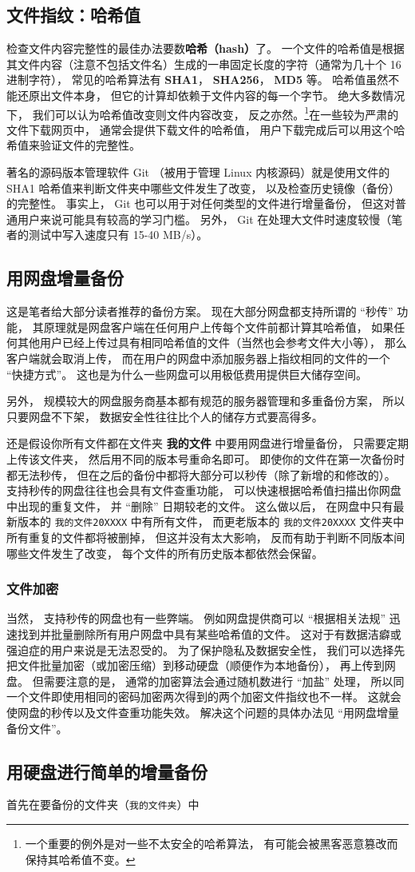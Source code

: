 \subsection{文件指纹：哈希值}
检查文件内容完整性的最佳办法要数\textbf{哈希（hash）}了。 一个文件的哈希值是根据其文件内容（注意不包括文件名）生成的一串固定长度的字符（通常为几十个 16 进制字符）， 常见的哈希算法有 \textbf{SHA1}， \textbf{SHA256}， \textbf{MD5} 等。 哈希值虽然不能还原出文件本身， 但它的计算却依赖于文件内容的每一个字节。 绝大多数情况下， 我们可以认为哈希值改变则文件内容改变， 反之亦然。\footnote{一个重要的例外是对一些不太安全的哈希算法， 有可能会被黑客恶意篡改而保持其哈希值不变。}在一些较为严肃的文件下载网页中， 通常会提供下载文件的哈希值， 用户下载完成后可以用这个哈希值来验证文件的完整性。

著名的源码版本管理软件 Git （被用于管理 Linux 内核源码）就是使用文件的 SHA1 哈希值来判断文件夹中哪些文件发生了改变， 以及检查历史镜像（备份）的完整性。 事实上， Git 也可以用于对任何类型的文件进行增量备份， 但这对普通用户来说可能具有较高的学习门槛。 另外， Git 在处理大文件时速度较慢（笔者的测试中写入速度只有 15-40 MB/s）。

\subsection{用网盘增量备份}
这是笔者给大部分读者推荐的备份方案。 现在大部分网盘都支持所谓的 “秒传” 功能， 其原理就是网盘客户端在任何用户上传每个文件前都计算其哈希值， 如果任何其他用户已经上传过具有相同哈希值的文件（当然也会参考文件大小等）， 那么客户端就会取消上传， 而在用户的网盘中添加服务器上指纹相同的文件的一个 “快捷方式”。 这也是为什么一些网盘可以用极低费用提供巨大储存空间。

另外， 规模较大的网盘服务商基本都有规范的服务器管理和多重备份方案， 所以只要网盘不下架， 数据安全性往往比个人的储存方式要高得多。

还是假设你所有文件都在文件夹 \textbf{我的文件} 中要用网盘进行增量备份， 只需要定期上传该文件夹， 然后用不同的版本号重命名即可。 即使你的文件在第一次备份时都无法秒传， 但在之后的备份中都将大部分可以秒传（除了新增的和修改的）。 支持秒传的网盘往往也会具有文件查重功能， 可以快速根据哈希值扫描出你网盘中出现的重复文件， 并 “删除” 日期较老的文件。 这么做以后， 在网盘中只有最新版本的 \verb|我的文件20XXXX| 中有所有文件， 而更老版本的 \verb|我的文件20XXXX| 文件夹中所有重复的文件都将被删掉， 但这并没有太大影响， 反而有助于判断不同版本间哪些文件发生了改变， 每个文件的所有历史版本都依然会保留。

\subsubsection{文件加密}
当然， 支持秒传的网盘也有一些弊端。 例如网盘提供商可以 “根据相关法规” 迅速找到并批量删除所有用户网盘中具有某些哈希值的文件。 这对于有数据洁癖或强迫症的用户来说是无法忍受的。 为了保护隐私及数据安全性， 我们可以选择先把文件批量加密（或加密压缩）到移动硬盘（顺便作为本地备份）， 再上传到网盘。 但需要注意的是， 通常的加密算法会通过随机数进行 “加盐” 处理， 所以同一个文件即使用相同的密码加密两次得到的两个加密文件指纹也不一样。 这就会使网盘的秒传以及文件查重功能失效。 解决这个问题的具体办法见 “用网盘增量备份文件”。

\subsection{用硬盘进行简单的增量备份}
首先在要备份的文件夹（\verb|我的文件夹|）中

